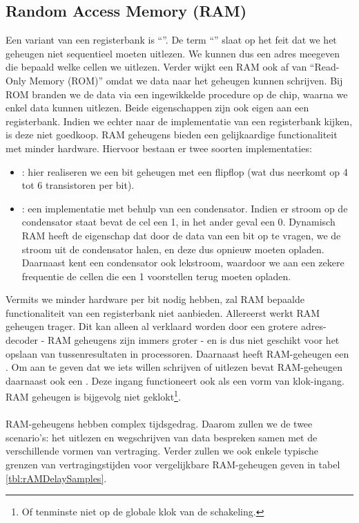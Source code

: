 \subsection{Random Access Memory (RAM)}
Een variant van een registerbank is ``''. De term ``'' slaat op het feit dat we het geheugen niet sequentieel moeten uitlezen. We kunnen dus een adres meegeven die bepaald welke cellen we uitlezen. Verder wijkt een RAM ook af van ``Read-Only Memory (ROM)'' omdat we data naar het geheugen kunnen schrijven. Bij ROM branden we de data via een ingewikkelde procedure op de chip, waarna we enkel data kunnen uitlezen. Beide eigenschappen zijn ook eigen aan een registerbank. Indien we echter naar de implementatie van een registerbank kijken, is deze niet goedkoop. RAM geheugens bieden een gelijkaardige functionaliteit met minder hardware. Hiervoor bestaan er twee soorten implementaties:
\begin{itemize}
 \item {}: hier realiseren we een bit geheugen met een flipflop (wat dus neerkomt op 4 tot 6 transistoren per bit).
 \item {}: een implementatie met behulp van een condensator. Indien er stroom op de condensator staat bevat de cel een 1, in het ander geval een 0. Dynamisch RAM heeft de eigenschap dat door de data van een bit op te vragen, we de stroom uit de condensator halen, en deze dus opnieuw moeten opladen. Daarnaast kent een condensator ook lekstroom, waardoor we aan een zekere frequentie de cellen die een 1 voorstellen terug moeten opladen.
\end{itemize}
Vermits we minder hardware per bit nodig hebben, zal RAM bepaalde functionaliteit van een registerbank niet aanbieden. Allereerst werkt RAM geheugen trager. Dit kan alleen al verklaard worden door een grotere adres-decoder - RAM geheugens zijn immers groter - en is dus niet geschikt voor het opslaan van tussenresultaten in processoren. Daarnaast heeft RAM-geheugen een . Om aan te geven dat we iets willen schrijven of uitlezen bevat RAM-geheugen daarnaast ook een . Deze ingang functioneert ook als een vorm van klok-ingang. RAM geheugen is bijgevolg niet geklokt\footnote{Of tenminste niet op de globale klok van de schakeling.}.
\paragraph{}
RAM-geheugens hebben complex tijdsgedrag. Daarom zullen we de twee scenario's: het uitlezen en wegschrijven van data bespreken samen met de verschillende vormen van vertraging. Verder zullen we ook enkele typische grenzen van vertragingstijden voor vergelijkbare RAM-geheugen geven in tabel \ref{tbl:rAMDelaySamples}.

